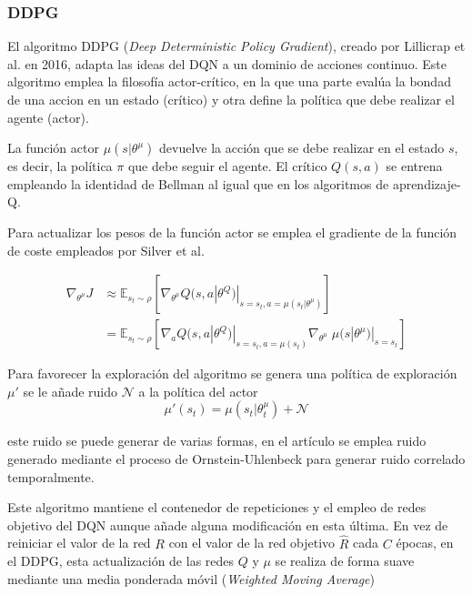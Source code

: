 \subsubsection{DDPG}

El algoritmo DDPG (\textit{Deep Deterministic Policy Gradient}), creado por Lillicrap et al.  en 2016, adapta las ideas del DQN a un dominio de acciones continuo. Este algoritmo emplea la filosofía actor-crítico, en la que una parte evalúa la bondad de una accion en un estado (crítico) y  otra define la política que debe realizar el agente (actor).

La función actor $\mu(s|\theta^\mu)$ devuelve la acción que se debe realizar en el estado $s$, es decir, la política $\pi$ que debe seguir el agente. El crítico $Q(s,a)$ se entrena empleando la identidad de Bellman al igual que en los algoritmos de aprendizaje-Q.

Para actualizar los pesos de la función actor se emplea el gradiente de la función de coste empleados por Silver et al.  

	\begin{align}
		\nabla_{\theta^\mu}J &\approx \mathbb{E}_{s_t \sim \rho}\left[ \nabla_{\theta^\mu} Q(s,a |\theta^Q)|_{s=s_t,a=\mu(s_t|\theta^\mu)}\right]\\
		&=  \mathbb{E}_{s_t \sim \rho}\left[ \nabla_{a} Q(s,a |\theta^Q)|_{s=s_t,a=\mu(s_t)} \nabla_{\theta^\mu}\; \mu(s|\theta^\mu)|_{s=s_t}    \right]\nonumber 
	\end{align}

Para favorecer la exploración del algoritmo se genera una política de exploración $\mu'$ se le añade ruido $\mathcal{N}$ a la política del actor
	\begin{equation}
		 \mu'(s_t)=\mu(s_t|\theta^\mu_t) + \mathcal{N}
	\end{equation}

este ruido se puede generar de varias formas, en el artículo se emplea ruido generado mediante el proceso de Ornstein-Uhlenbeck  para generar ruido correlado temporalmente.

Este algoritmo mantiene el contenedor de repeticiones y el empleo de redes objetivo del DQN aunque añade alguna modificación en esta última. En vez de reiniciar el valor de la red $R$ con el valor de la red objetivo $\hat R$ cada $C$ épocas, en el DDPG, esta actualización de las redes $Q$ y $\mu$ se realiza de forma suave mediante una media ponderada móvil (\textit{Weighted Moving Average})

